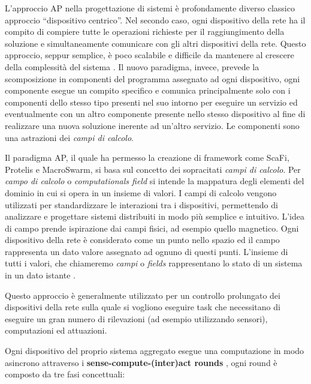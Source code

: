 \documentclass[12pt,a4paper,openright,twoside]{book}
\begin{document}
L'approccio \ac{AP} nella progettazione di sistemi è profondamente diverso classico approccio ``dispositivo centrico''.
Nel secondo caso, ogni dispositivo della rete ha il compito di compiere tutte le operazioni richieste per il raggiungimento della soluzione e simultaneamente comunicare con gli altri dispositivi della rete. Questo approccio, seppur semplice, è poco scalabile e difficile da mantenere al crescere della complessità del sistema \cite{Pianini2017}. 
Il nuovo paradigma, invece, prevede la scomposizione in componenti del programma assegnato ad ogni dispositivo, ogni componente esegue un compito specifico e comunica principalmente solo con i componenti dello stesso tipo presenti nel suo intorno per eseguire un servizio ed eventualmente con un altro componente presente nello stesso dispositivo al fine di realizzare una nuova soluzione inerente ad un'altro servizio. Le componenti sono una astrazioni dei \textit{campi di calcolo}.

Il paradigma \ac{AP}, il quale ha permesso la creazione di framework come ScaFi, Protelis e MacroSwarm, si basa sul concetto dei sopracitati \textit{campi di calcolo}. Per \textit{campo di calcolo} o \textit{computationals field} si intende la mappatura degli elementi del dominio in cui si opera in un insieme di valori.
I campi di calcolo vengono utilizzati per standardizzare le interazioni tra i dispositivi, permettendo di analizzare e progettare sistemi distribuiti in modo più semplice e intuitivo. L'idea di campo prende ispirazione dai campi fisici, ad esempio quello magnetico. Ogni dispositivo della rete è considerato come un punto nello spazio ed il campo rappresenta un dato valore assegnato ad ognuno di questi punti. L'insieme di tutti i valori, che chiameremo \textit{campi} o \textit{fields} rappresentano lo stato di un sistema in un dato istante \cite{Audrito2019}.

Questo approccio è generalmente utilizzato per un controllo prolungato dei dispositivi della rete sulla quale si vogliono eseguire task che necessitano di eseguire un gran numero di rilevazioni (ad esempio utilizzando sensori), computazioni ed attuazioni.

Ogni dispositivo del proprio sistema aggregato esegue una computazione in modo asincrono attraverso i \textbf{sense-compute-(inter)act rounds}\label{sec:sense-compute-interact} \cite{Macroswarm}, ogni round è composto da tre fasi concettuali:
\end{document}
